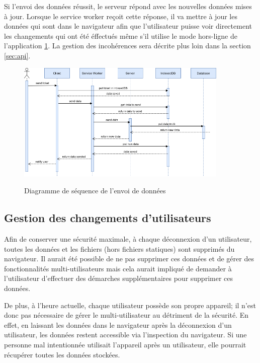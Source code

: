 \documentclass{EPL-master-thesis-covers-FR}
\begin{document}
					Si l'envoi des données réussit, le serveur répond avec les nouvelles données mises à jour. Lorsque le service worker reçoit cette réponse, il va mettre à jour les données qui sont dans le navigateur afin que l'utilisateur puisse voir directement les changements qui ont été éffectués même s'il utilise le mode hors-ligne de l'application \ref{fig:flows2}. La gestion des incohérences sera décrite plus loin dans la section \ref{sec:api}.
					
					\begin{figure}[H]
						\centering
						\includegraphics[width=0.9\textwidth]{images/flow2}
						\label{fig:flows2}
						\caption{Diagramme de séquence de l'envoi de données}
					\end{figure}
			
			\subsection{Gestion des changements d'utilisateurs}		
				Afin de conserver une sécurité maximale, à chaque déconnexion d'un utilisateur, toutes les données et les fichiers (hors fichiers statiques) sont supprimés du navigateur. Il aurait été possible de ne pas supprimer ces données et de gérer des fonctionnalités multi-utilisateurs mais cela aurait impliqué de demander à l'utilisateur d'effectuer des démarches supplémentaires pour supprimer ces données. 
			
				De plus, à l'heure actuelle, chaque utilisateur possède son propre appareil; il n'est donc pas nécessaire de gérer le multi-utilisateur au détriment de la sécurité. En effet, en laissant les données dans le navigateur après la déconnexion d'un utilisateur, les données restent accessible via l'inspection du navigateur. Si une personne mal intentionnée utilisait l'appareil après un utilisateur, elle pourrait récupérer toutes les données stockées. 
				
\end{document}
